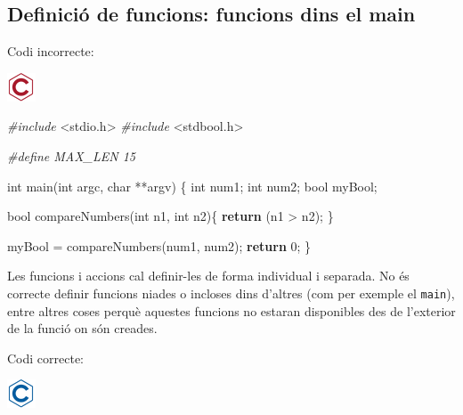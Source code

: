 \documentclass[
]{book}
\newenvironment{Shaded}{\begin{snugshade}}{\end{snugshade}}
\newcommand{\ControlFlowTok}[1]{\textcolor[rgb]{0.13,0.29,0.53}{\textbf{#1}}}
\newcommand{\DataTypeTok}[1]{\textcolor[rgb]{0.13,0.29,0.53}{#1}}
\newcommand{\DecValTok}[1]{\textcolor[rgb]{0.00,0.00,0.81}{#1}}
\newcommand{\ImportTok}[1]{#1}
\newcommand{\NormalTok}[1]{#1}
\newcommand{\PreprocessorTok}[1]{\textcolor[rgb]{0.56,0.35,0.01}{\textit{#1}}}
\begin{document}
\hypertarget{definiciuxf3-de-funcions-funcions-dins-el-main}{%
\subsection{Definició de funcions: funcions dins el main}\label{definiciuxf3-de-funcions-funcions-dins-el-main}}

Codi incorrecte:

\includegraphics{./img/c_err.png}

\begin{Shaded}
\begin{Highlighting}[]
\PreprocessorTok{\#include }\ImportTok{\textless{}stdio.h\textgreater{}}
\PreprocessorTok{\#include }\ImportTok{\textless{}stdbool.h\textgreater{}}

\PreprocessorTok{\#define MAX\_LEN 15}

\DataTypeTok{int}\NormalTok{ main(}\DataTypeTok{int}\NormalTok{ argc, }\DataTypeTok{char}\NormalTok{ **argv) \{}
    \DataTypeTok{int}\NormalTok{ num1;}
    \DataTypeTok{int}\NormalTok{ num2;}
    \DataTypeTok{bool}\NormalTok{ myBool;}

    \DataTypeTok{bool}\NormalTok{ compareNumbers(}\DataTypeTok{int}\NormalTok{ n1, }\DataTypeTok{int}\NormalTok{ n2)\{}
       \ControlFlowTok{return}\NormalTok{ (n1 \textgreater{} n2); }
\NormalTok{    \}}
    
\NormalTok{    myBool = compareNumbers(num1, num2);}
    \ControlFlowTok{return} \DecValTok{0}\NormalTok{;}
\NormalTok{\}}
\end{Highlighting}
\end{Shaded}

Les funcions i accions cal definir-les de forma individual i separada. No és correcte definir funcions niades o incloses dins d'altres (com per exemple el \texttt{main}), entre altres coses perquè aquestes funcions no estaran disponibles des de l'exterior de la funció on són creades.

Codi correcte:

\includegraphics{./img/c.png}
\end{document}
